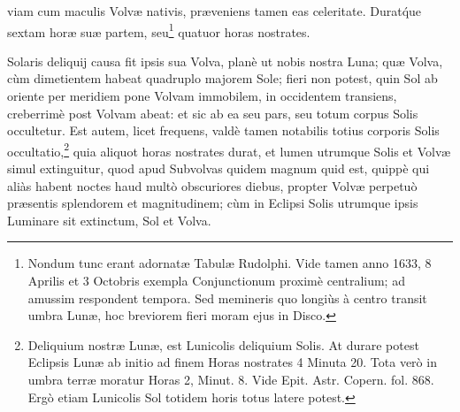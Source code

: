 \documentclass[a4paper, 11pt, oneside, polutonikogreek, german]{article}
\begin{document}
viam cum maculis Volvæ nativis, præveniens tamen eas celeritate. Durat\'que sextam horæ suæ partem, seu\footnote{Nondum tunc erant adornatæ Tabulæ Rudolphi. Vide tamen anno 1633, 8 Aprilis et 3 Octobris exempla Conjunctionum proximè centralium; ad amussim respondent tempora. Sed memineris quo longiùs à centro transit umbra Lunæ, hoc breviorem fieri moram ejus in Disco.} quatuor horas nostrates.

Solaris deliquij causa fit ipsis sua Volva, planè ut nobis nostra Luna; quæ Volva, cùm dimetientem habeat quadruplo majorem Sole; fieri non potest, quin Sol ab oriente per meridiem pone Volvam immobilem, in occidentem transiens, creberrimè post Volvam abeat: et sic ab ea seu pars, seu totum corpus Solis occultetur. Est autem, licet frequens, valdè tamen notabilis totius corporis Solis occultatio,\footnote{Deliquium nostræ Lunæ, est Lunicolis deliquium Solis. At durare potest Eclipsis Lunæ ab initio ad finem Horas nostrates 4 Minuta 20. Tota verò in umbra terræ moratur Horas 2, Minut. 8. Vide Epit. Astr. Copern. fol. 868. Ergò etiam Lunicolis Sol totidem horis totus latere potest.} quia aliquot horas nostrates durat, et lumen utrumque Solis et Volvæ simul extinguitur, quod apud Subvolvas quidem magnum quid est, quippè qui aliàs habent noctes haud multò obscuriores diebus, propter Volvæ perpetuò præsentis splendorem et magnitudinem; cùm in Eclipsi Solis utrumque ipsis Luminare sit extinctum, Sol et Volva.
\end{document}
